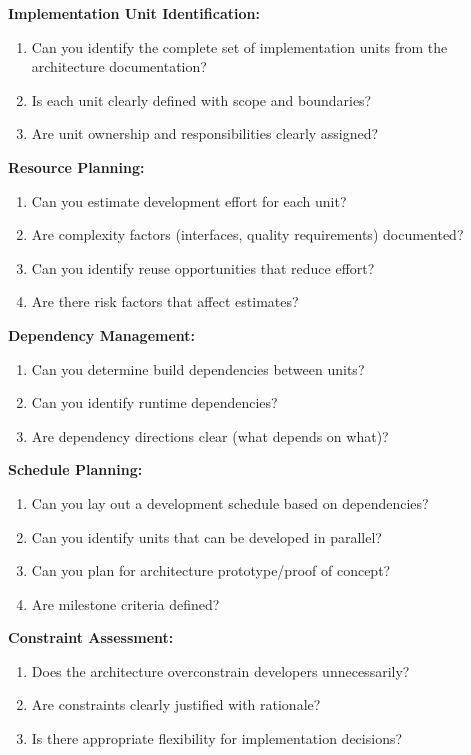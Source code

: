 \documentclass[11pt]{article}
\begin{document}
\begin{questionbox}

\textbf{Implementation Unit Identification:}
\begin{enumerate}
    \item Can you identify the complete set of implementation units from the architecture documentation?
    \item Is each unit clearly defined with scope and boundaries?
    \item Are unit ownership and responsibilities clearly assigned?
\end{enumerate}

\textbf{Resource Planning:}
\begin{enumerate}[resume]
    \item Can you estimate development effort for each unit?
    \item Are complexity factors (interfaces, quality requirements) documented?
    \item Can you identify reuse opportunities that reduce effort?
    \item Are there risk factors that affect estimates?
\end{enumerate}

\textbf{Dependency Management:}
\begin{enumerate}[resume]
    \item Can you determine build dependencies between units?
    \item Can you identify runtime dependencies?
    \item Are dependency directions clear (what depends on what)?
\end{enumerate}

\textbf{Schedule Planning:}
\begin{enumerate}[resume]
    \item Can you lay out a development schedule based on dependencies?
    \item Can you identify units that can be developed in parallel?
    \item Can you plan for architecture prototype/proof of concept?
    \item Are milestone criteria defined?
\end{enumerate}

\textbf{Constraint Assessment:}
\begin{enumerate}[resume]
    \item Does the architecture overconstrain developers unnecessarily?
    \item Are constraints clearly justified with rationale?
    \item Is there appropriate flexibility for implementation decisions?
\end{enumerate}
\end{questionbox}
\end{document}

